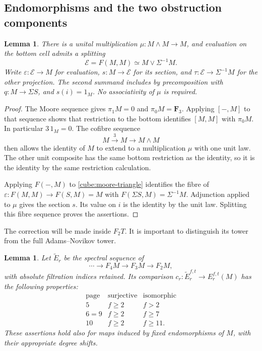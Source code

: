 \documentclass[11pt]{article}
\newtheorem{lemma}[theorem]{Lemma}
\theoremstyle{definition}
\theoremstyle{remark}
\numberwithin{equation}{section}
\begin{document}
\subsection{Endomorphisms and the two obstruction components}

\begin{lemma}\label{cube:endomorphisms}
There is a unital multiplication \(\mu:M\wedge M\to M\),
and evaluation on the bottom cell admits a splitting
\begin{equation}\label{cube:end-splitting}
 \mathcal E=F(M,M)\simeq M\vee\Sigma^{-1}M.
\end{equation}
Write \(\varepsilon:\mathcal E\to M\) for evaluation,
\(s:M\to\mathcal E\) for its section, and
\(\tau:\mathcal E\to\Sigma^{-1}M\) for the other projection.
The second summand includes by precomposition with
\(q:M\to\Sigma S\), and \(s(i)=1_M\).
No associativity of \(\mu\) is required.
\end{lemma}

\begin{proof}
The Moore sequence gives \(\pi_1M=0\) and
\(\pi_0M=\mathbf F_3\).  Applying \([-,M]\) to that sequence
shows that restriction to the bottom identifies
\([M,M]\) with \(\pi_0M\).  In particular \(3\,1_M=0\).
The cofibre sequence
\[
 M\xrightarrow{3}M\longrightarrow M\wedge M
\]
then allows the identity of \(M\) to extend to a
multiplication \(\mu\) with one unit law.  The other
unit composite has the same bottom restriction as
the identity, so it is the identity by the same
restriction calculation.

Applying \(F(-,M)\) to \eqref{cube:moore-triangle}
identifies the fibre of
\(\varepsilon:F(M,M)\to F(S,M)=M\) with
\(F(\Sigma S,M)=\Sigma^{-1}M\).
Adjunction applied to \(\mu\) gives the section \(s\).
Its value on \(i\) is the identity by the unit law.
Splitting this fibre sequence proves the assertions.
\end{proof}

The correction will be made inside \(F_2T\).  It is
important to distinguish its tower from the full
Adams--Novikov tower.

\begin{lemma}\label{cube:relative-tower}
Let \(\widetilde E_r\) be the spectral sequence of
\[
 \cdots\longrightarrow F_4M\longrightarrow F_3M
       \longrightarrow F_2M,
\]
with absolute filtration indices retained.  Its
comparison \(c_r:\widetilde E_r^{f,t}\to E_r^{f,t}(M)\)
has the following properties:
\[
\begin{array}{c|c|c}
\text{page}&\text{surjective}&\text{isomorphic}\\ \hline
5&f\geq2&f>2\\
6=9&f\geq2&f\geq7\\
10&f\geq2&f\geq11.
\end{array}
\]
These assertions hold also for maps induced by fixed
endomorphisms of \(M\), with their appropriate degree
shifts.
\end{lemma}
\end{document}
